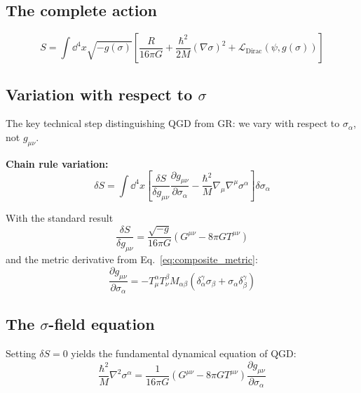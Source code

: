 \documentclass[11pt,a4paper]{article}
\theoremstyle{definition}
\theoremstyle{remark}
\begin{document}
	\subsection{The complete action}
	
	\begin{equation}
		S = \int \dd^4x \sqrt{-g(\sigma)} \left[ \frac{R}{16\pi G} + \frac{\hbar^2}{2M}(\nabla\sigma)^2 + \mathcal{L}_{\text{Dirac}}(\psi, g(\sigma)) \right]
		\label{eq:complete_action}
	\end{equation}
	
	\subsection{Variation with respect to $\sigma$}
	
	The key technical step distinguishing QGD from GR: we vary with respect to $\sigma_\alpha$, not $g_{\mu\nu}$.
	
	\textbf{Chain rule variation:}
	\begin{equation}
		\delta S = \int \dd^4x \left[ \frac{\delta S}{\delta g_{\mu\nu}} \frac{\partial g_{\mu\nu}}{\partial \sigma_\alpha} - \frac{\hbar^2}{M} \nabla_\mu \nabla^\mu \sigma^\alpha \right] \delta\sigma_\alpha
		\label{eq:variation}
	\end{equation}
	
	With the standard result
	\begin{equation}
		\frac{\delta S}{\delta g_{\mu\nu}} = \frac{\sqrt{-g}}{16\pi G}\left(G^{\mu\nu} - 8\pi G T^{\mu\nu}\right)
		\label{eq:metric_variation}
	\end{equation}
	and the metric derivative from Eq.~\eqref{eq:composite_metric}:
	\begin{equation}
		\frac{\partial g_{\mu\nu}}{\partial \sigma_\alpha} = -T^\alpha_\mu T^\beta_\nu M_{\alpha\beta}(\delta^\gamma_\alpha \sigma_\beta + \sigma_\alpha \delta^\gamma_\beta)
		\label{eq:metric_derivative}
	\end{equation}
	
	\subsection{The $\sigma$-field equation}
	
	Setting $\delta S = 0$ yields the fundamental dynamical equation of QGD:
	\begin{equation}
		\boxed{\frac{\hbar^2}{M} \nabla^2 \sigma^\alpha = \frac{1}{16\pi G}\left(G^{\mu\nu} - 8\pi G T^{\mu\nu}\right) \frac{\partial g_{\mu\nu}}{\partial \sigma_\alpha}}
		\label{eq:sigma_field_equation}
	\end{equation}
	
\end{document}
